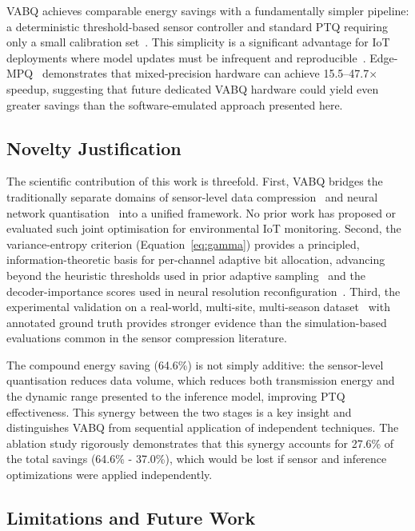 VABQ achieves comparable energy savings with a fundamentally simpler pipeline: a deterministic threshold-based sensor controller and standard PTQ requiring only a small calibration set~\cite{nagel2021whitepaper}. This simplicity is a significant advantage for IoT deployments where model updates must be infrequent and reproducible~\cite{edgemlops2025}. Edge-MPQ~\cite{edgempq2024} demonstrates that mixed-precision hardware can achieve 15.5--47.7$\times$ speedup, suggesting that future dedicated VABQ hardware could yield even greater savings than the software-emulated approach presented here.

\subsection{Novelty Justification}
\label{sec:disc_novelty}

The scientific contribution of this work is threefold. First, VABQ bridges the traditionally separate domains of sensor-level data compression~\cite{atitallah2023autonomous, azar2020bounded, aljanabi2022sax} and neural network quantisation~\cite{nagel2021whitepaper, quantsurvey2021, smoothquant2024} into a unified framework. No prior work has proposed or evaluated such joint optimisation for environmental IoT monitoring. Second, the variance-entropy criterion (Equation~\ref{eq:gamma}) provides a principled, information-theoretic basis for per-channel adaptive bit allocation, advancing beyond the heuristic thresholds used in prior adaptive sampling~\cite{atitallah2023autonomous} and the decoder-importance scores used in neural resolution reconfiguration~\cite{pandey2025neural}. Third, the experimental validation on a real-world, multi-site, multi-season dataset~\cite{karmakar2024indoor} with annotated ground truth provides stronger evidence than the simulation-based evaluations common in the sensor compression literature.

The compound energy saving (64.6\%) is not simply additive: the sensor-level quantisation reduces data volume, which reduces both transmission energy and the dynamic range presented to the inference model, improving PTQ effectiveness. This synergy between the two stages is a key insight and distinguishes VABQ from sequential application of independent techniques. The ablation study rigorously demonstrates that this synergy accounts for 27.6\% of the total savings (64.6\% - 37.0\%), which would be lost if sensor and inference optimizations were applied independently.

\subsection{Limitations and Future Work}
\label{sec:disc_limitations}

